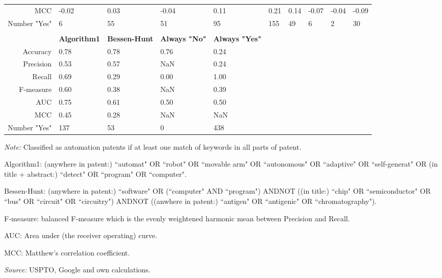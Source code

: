 \begin{table}
\begin{footnotesize}
\begin{threeparttable}
\begin{tabular}{rlllllllll}
MCC & -0.02 & 0.03 & -0.04 & 0.11 & 0.21 & 0.14 & -0.07 & -0.04 & -0.09  \tabularnewline 
Number "Yes" & 6 & 55 & 51 & 95 & 155 & 49 & 6 & 2 & 30  \tabularnewline 
\tabularnewline 
 & \textbf{Algorithm1} & \textbf{Bessen-Hunt} & \textbf{Always "No"} & \textbf{Always "Yes"}  \tabularnewline 
Accuracy & 0.78 & 0.78 & 0.76 & 0.24 & & & & &  \tabularnewline 
Precision & 0.53 & 0.57 & NaN & 0.24 & & & & &  \tabularnewline 
Recall & 0.69 & 0.29 & 0.00 & 1.00 & & & & &  \tabularnewline 
F-measure & 0.60 & 0.38 & NaN & 0.39 & & & & &  \tabularnewline 
AUC & 0.75 & 0.61 & 0.50 & 0.50 & & & & &  \tabularnewline 
MCC & 0.45 & 0.28 & NaN & NaN & & & & &  \tabularnewline 
Number "Yes" & 137 & 53 & 0 & 438 & & & & &  \tabularnewline 
\bottomrule 
\end{tabular} 
\begin{tablenotes}
\footnotesize
\item\textit{Note:} Classified as automation patents if at least one match of keywords in all parts of patent. \item Algorithm1: (anywhere in patent:) ``automat" OR ``robot" OR ``movable arm" OR ``autonomous" OR  ``adaptive" OR ``self-generat" OR (in title + abstract:) ``detect" OR ``program" OR ``computer".
\item Bessen-Hunt: (anywhere in patent:) ``software" OR (``computer" AND ``program") ANDNOT ((in title:) ``chip" OR ``semiconductor" OR ``bus" OR ``circuit" OR ``circuitry") ANDNOT ((anwhere in patent:) ``antigen" OR ``antigenic" OR ``chromatography").
\item F-measure: balanced F-measure which is the evenly weightened harmonic mean between Precision and Recall. 
\item AUC: Area under (the receiver operating) curve.
\item MCC: Matthew's correlation coefficient.
\item\textit{Source:} USPTO, Google and own calculations.
\end{tablenotes}
\end{threeparttable}
\end{footnotesize}
\end{table}
